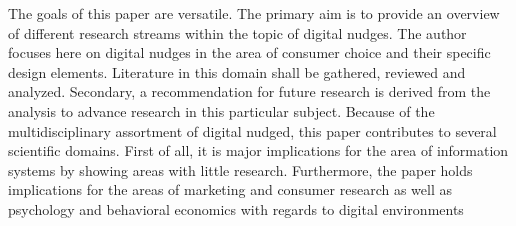 

The goals of this paper are versatile. The primary aim is to provide an overview of different research streams within the topic of digital nudges. The author focuses here on digital nudges in the area of consumer choice and their specific design elements.  Literature in this domain shall be gathered, reviewed and analyzed. Secondary, a recommendation for future research is derived from the analysis to advance research in this particular subject. Because of the multidisciplinary assortment of digital nudged, this paper contributes to several scientific domains. First of all, it is major implications for the area of information systems by showing areas with little research. Furthermore, the paper holds implications for the areas of marketing and consumer research as well as psychology and behavioral economics with regards to digital environments
